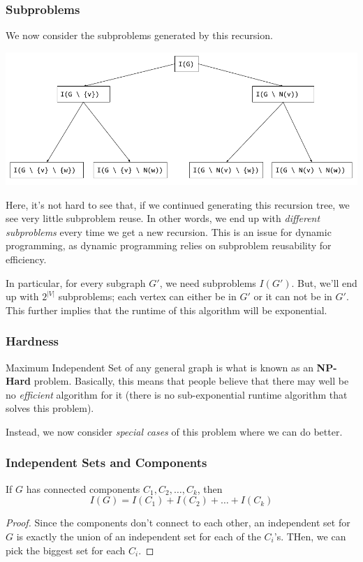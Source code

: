 \documentclass[letterpaper]{article}
\begin{document}
\subsubsection{Subproblems}
We now consider the subproblems generated by this recursion. 
\begin{center}
    \includegraphics[scale=0.5]{assets/indep_set_sub.png}
\end{center}
Here, it's not hard to see that, if we continued generating this recursion tree, we see very little subproblem reuse. In other words, we end up with \emph{different subproblems} every time we get a new recursion. This is an issue for dynamic programming, as dynamic programming relies on subproblem reusability for efficiency.  

\bigskip 

In particular, for every subgraph $G'$, we need subproblems $I(G')$. But, we'll end up with $2^{|V|}$ subproblems; each vertex can either be in $G'$ or it can not be in $G'$. This further implies that the runtime of this algorithm will be exponential. 

\subsubsection{Hardness}
Maximum Independent Set of any general graph is what is known as an \textbf{NP-Hard} problem. Basically, this means that people believe that there may well be no \emph{efficient} algorithm for it (there is no sub-exponential runtime algorithm that solves this problem). 

\bigskip 

Instead, we now consider \emph{special cases} of this problem where we can do better. 

\subsubsection{Independent Sets and Components}
\begin{lemma}{}{}
    If $G$ has connected components $C_1, C_2, \dots, C_k$, then 
    \[I(G) = I(C_1) + I(C_2) + \dots + I(C_k)\]
\end{lemma}
\begin{mdframed}[]
    \begin{proof}
        Since the components don't connect to each other, an independent set for $G$ is exactly the union of an independent set for each of the $C_i$'s. THen, we can pick the biggest set for each $C_i$. 
    \end{proof}
\end{mdframed}
\end{document}
